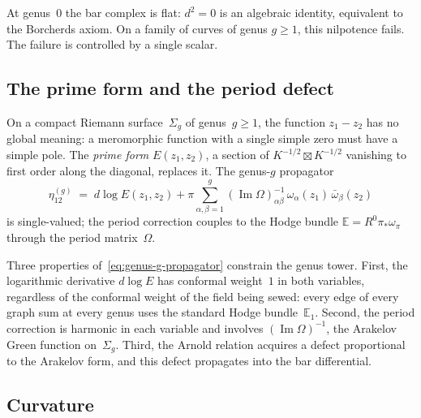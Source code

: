 \documentclass[11pt,reqno]{amsart}
\theoremstyle{definition}
\theoremstyle{remark}
\numberwithin{equation}{section}
\begin{document}
At genus~$0$ the bar complex is flat: $d^2 = 0$ is an
algebraic identity, equivalent to the Borcherds axiom.
On a family of curves of genus $g \ge 1$, this nilpotence
fails. The failure is controlled by a single scalar.

\subsection{The prime form and the period defect}
\label{ssec:prime-form}

On a compact Riemann surface~$\Sigma_g$ of genus~$g \ge 1$,
the function $z_1 - z_2$ has no global meaning: a
meromorphic function with a single simple zero must have a
simple pole. The \emph{prime form} $E(z_1, z_2)$, a
section of $K^{-1/2} \boxtimes K^{-1/2}$ vanishing to
first order along the diagonal, replaces it. The
genus-$g$ propagator
\begin{equation}\label{eq:genus-g-propagator}
\eta^{(g)}_{12}
\;=\;
d\log E(z_1, z_2)
+ \pi \sum_{\alpha,\beta = 1}^{g}
(\operatorname{Im}\Omega)^{-1}_{\alpha\beta}
\,\omega_\alpha(z_1)\,\bar\omega_\beta(z_2)
\end{equation}
is single-valued; the period correction couples to the
Hodge bundle $\mathbb{E} = R^0\pi_*\omega_\pi$ through
the period matrix~$\Omega$.

Three properties of~\eqref{eq:genus-g-propagator} constrain
the genus tower. First, the logarithmic derivative
$d\log E$ has conformal weight~$1$ in both variables,
regardless of the conformal weight of the field being
sewed: every edge of every graph sum at every genus uses
the standard Hodge bundle~$\mathbb{E}_1$. Second, the
period correction is harmonic in each variable and involves
$(\operatorname{Im}\Omega)^{-1}$, the Arakelov Green
function on~$\Sigma_g$. Third, the Arnold relation acquires
a defect proportional to the Arakelov form, and this defect
propagates into the bar differential.

\subsection{Curvature}
\label{ssec:curvature}
\end{document}
